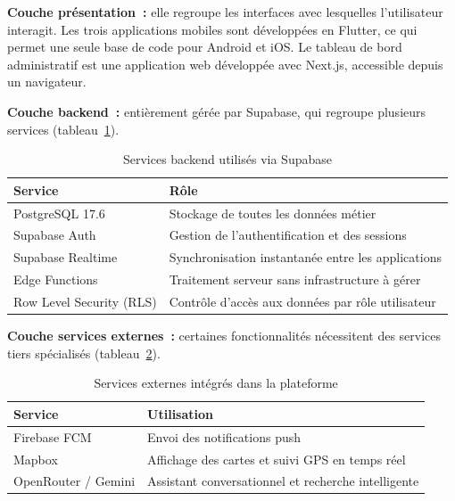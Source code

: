\documentclass[12pt,fleqn,a4paper]{report}
\begin{document}
\begin{justify}
\textbf{Couche présentation~:} elle regroupe les interfaces avec lesquelles l'utilisateur interagit. Les trois applications mobiles sont développées en Flutter, ce qui permet une seule base de code pour Android et iOS. Le tableau de bord administratif est une application web développée avec Next.js, accessible depuis un navigateur.

\vspace{0.3cm}
\textbf{Couche backend~:} entièrement gérée par Supabase, qui regroupe plusieurs services (tableau~\ref{tab:backend}).

\begin{table}[H]
\centering
\renewcommand{\arraystretch}{1.4}
\begin{tabular}{|l|l|}
\hline
\textbf{Service} & \textbf{Rôle} \\
\hline
PostgreSQL 17.6 & Stockage de toutes les données métier \\
\hline
Supabase Auth & Gestion de l'authentification et des sessions \\
\hline
Supabase Realtime & Synchronisation instantanée entre les applications \\
\hline
Edge Functions & Traitement serveur sans infrastructure à gérer \\
\hline
Row Level Security (RLS) & Contrôle d'accès aux données par rôle utilisateur \\
\hline
\end{tabular}
\caption{Services backend utilisés via Supabase}
\label{tab:backend}
\end{table}

\vspace{0.3cm}
\textbf{Couche services externes~:} certaines fonctionnalités nécessitent des services tiers spécialisés (tableau~\ref{tab:externes}).

\begin{table}[H]
\centering
\renewcommand{\arraystretch}{1.4}
\begin{tabular}{|l|l|}
\hline
\textbf{Service} & \textbf{Utilisation} \\
\hline
Firebase FCM & Envoi des notifications push \\
\hline
Mapbox & Affichage des cartes et suivi GPS en temps réel \\
\hline
OpenRouter / Gemini & Assistant conversationnel et recherche intelligente \\
\hline
\end{tabular}
\caption{Services externes intégrés dans la plateforme}
\label{tab:externes}
\end{table}


\end{justify}
\end{document}
